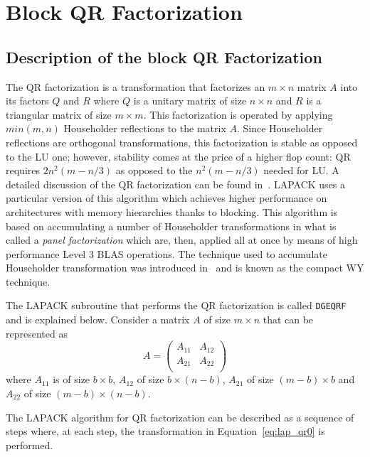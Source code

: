 \documentclass[runningheads]{llncs}
\begin{document}
\section{Block QR Factorization}
\label{sec:lapack}

\subsection{Description of the block QR Factorization}

The QR factorization is a transformation that factorizes an $m \times
n$ matrix $A$ into its factors $Q$ and $R$ where $Q$ is a unitary
matrix of size $n \times n$ and $R$ is a triangular matrix of size $m
\times m$. This factorization is operated by applying $min(m,n)$ Householder
reflections to the matrix $A$. Since Householder reflections are
orthogonal transformations, this factorization is stable as opposed to
the LU one; however, stability comes at the price of a higher flop
count: QR requires $2n^2(m-n/3)$ as opposed to the $n^2(m-n/3)$ needed for
LU. A detailed discussion of the QR factorization can be found
in~\cite{golubvanloan,trefethenbau,stew:98}. LAPACK uses a particular
version of this algorithm which achieves higher performance on
architectures with memory hierarchies thanks to blocking. This
algorithm is based on accumulating a number of Householder
transformations in what is called a {\it panel factorization} which are,
then, applied all at once by means of high performance Level 3 BLAS
operations. The technique used to accumulate Householder
transformation was introduced in~\cite{64889} and is known as the compact WY technique.

The LAPACK subroutine that performs the QR factorization is called
\texttt{DGEQRF} and is explained below.
Consider a matrix $A$ of size $m \times n$ that can be represented as
\begin{displaymath}
  A=\left(\begin{array}{cc}
    A_{11} & A_{12}  \\
    A_{21} & A_{22}  \\
  \end{array}\right)
\end{displaymath}
where $A_{11}$ is of size $b \times b$, $A_{12}$ of size $b \times
(n-b)$, $A_{21}$ of size $(m-b) \times b$ and $A_{22}$ of size $(m-b)
\times (n-b)$.

The LAPACK algorithm for QR factorization can be described as a
sequence of steps where, at each step, the transformation in
Equation~\eqref{eq:lap_qr0} is performed.
\end{document}
